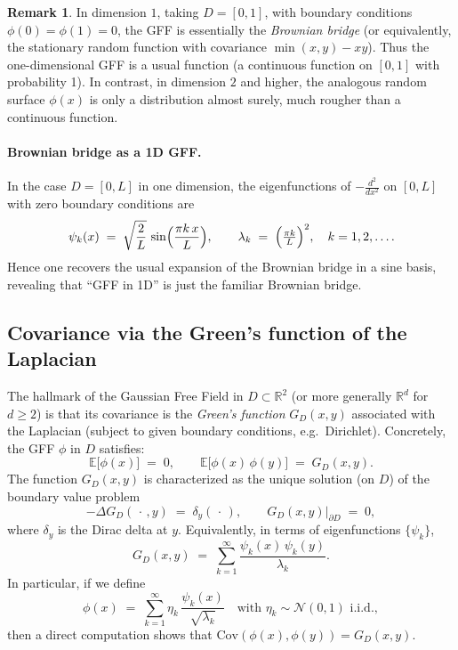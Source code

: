 \documentclass[letterpaper,11pt,oneside,reqno]{article}
\numberwithin{equation}{section}
\theoremstyle{definition}
\newtheorem{remark}[proposition]{Remark}
\begin{document}
\begin{remark}
In dimension $1$, taking $D=[0,1]$, with boundary conditions $\phi(0)=\phi(1)=0$, the GFF is essentially the \emph{Brownian bridge} (or equivalently, the stationary random function with covariance $\min(x,y)-xy$). Thus the one-dimensional GFF is a usual function (a continuous function on $[0,1]$ with probability 1). In contrast, in dimension $2$ and higher, the analogous random surface $\phi(x)$ is only a distribution almost surely, much rougher than a continuous function.
\end{remark}

\paragraph{Brownian bridge as a 1D GFF.}
In the case $D = [0,L]$ in one dimension, the eigenfunctions of $-\frac{d^2}{dx^2}$ on $[0,L]$ with zero boundary conditions are
\[
   \psi_k(x) \;=\; \sqrt{\frac{2}{L}} \,\sin\Bigl(\frac{\pi k\,x}{L}\Bigr),
   \qquad \lambda_k \;=\; \Bigl(\tfrac{\pi k}{L}\Bigr)^2,\quad k=1,2,\dots.
\]
Hence one recovers the usual expansion of the Brownian bridge in a sine basis, revealing that “GFF in 1D” is just the familiar Brownian bridge.

\subsection{Covariance via the Green's function of the Laplacian}
\label{subsec:GFF_covariance_Green}

The hallmark of the Gaussian Free Field in $D \subset \mathbb{R}^2$ (or more generally $\mathbb{R}^d$ for $d\ge 2$) is that its covariance is the \emph{Green's function} $G_D(x,y)$ associated with the Laplacian (subject to given boundary conditions, e.g.\ Dirichlet). Concretely, the GFF $\phi$ in $D$ satisfies:
\[
   \mathbb{E}\bigl[\phi(x)\bigr] \;=\; 0, 
   \qquad
   \mathbb{E}\bigl[\phi(x)\,\phi(y)\bigr] \;=\; G_D(x,y).
\]
The function $G_D(x,y)$ is characterized as the unique solution (on $D$) of the boundary value problem
\[
   -\Delta G_D(\,\cdot\,,y) \;=\; \delta_y(\,\cdot\,),
   \qquad
   G_D(x,y)\bigl|_{\partial D} \;=\; 0,
\]
where $\delta_y$ is the Dirac delta at $y$. Equivalently, in terms of eigenfunctions $\{\psi_k\}$,
\[
   G_D(x,y)
   \;=\;
   \sum_{k=1}^{\infty} \frac{\psi_k(x)\,\psi_k(y)}{\lambda_k}.
\]
In particular, if we define 
\[
   \phi(x) \;=\; \sum_{k=1}^{\infty} \eta_k \,\frac{\psi_k(x)}{\sqrt{\lambda_k}}
   \quad \text{with } \eta_k \sim \mathcal{N}(0,1)\text{ i.i.d.},
\]
then a direct computation shows that $\mathrm{Cov}(\phi(x),\phi(y)) = G_D(x,y)$.
\end{document}

